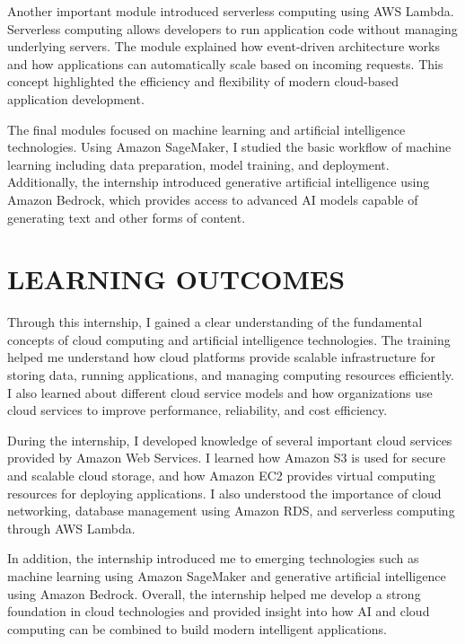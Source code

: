 \documentclass[12pt, a4paper, oneside]{report}
\begin{document}
Another important module introduced serverless computing using AWS Lambda. 
Serverless computing allows developers to run application code without managing 
underlying servers. The module explained how event-driven architecture works and how 
applications can automatically scale based on incoming requests. This concept 
highlighted the efficiency and flexibility of modern cloud-based application development.

The final modules focused on machine learning and artificial intelligence technologies. 
Using Amazon SageMaker, I studied the basic workflow of machine learning including 
data preparation, model training, and deployment. Additionally, the internship 
introduced generative artificial intelligence using Amazon Bedrock, which provides 
access to advanced AI models capable of generating text and other forms of content.


\chapter{LEARNING OUTCOMES}

Through this internship, I gained a clear understanding of the fundamental concepts of 
cloud computing and artificial intelligence technologies. The training helped me 
understand how cloud platforms provide scalable infrastructure for storing data, running 
applications, and managing computing resources efficiently. I also learned about 
different cloud service models and how organizations use cloud services to improve 
performance, reliability, and cost efficiency.

During the internship, I developed knowledge of several important cloud services 
provided by Amazon Web Services. I learned how Amazon S3 is used for secure and 
scalable cloud storage, and how Amazon EC2 provides virtual computing resources for 
deploying applications. I also understood the importance of cloud networking, database 
management using Amazon RDS, and serverless computing through AWS Lambda.

In addition, the internship introduced me to emerging technologies such as machine 
learning using Amazon SageMaker and generative artificial intelligence using Amazon 
Bedrock. Overall, the internship helped me develop a strong foundation in cloud 
technologies and provided insight into how AI and cloud computing can be combined 
to build modern intelligent applications.
\end{document}

